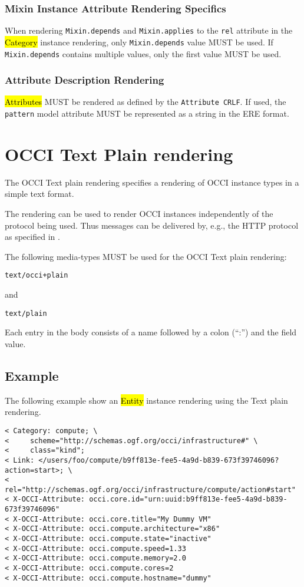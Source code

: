 \documentclass[10pt,a4paper]{article}
\begin{document}
\subsubsection{Mixin Instance Attribute Rendering Specifics}

When rendering {\tt Mixin.depends} and {\tt Mixin.applies} to the {\tt rel} attribute in the \hl{Category} instance rendering,
only {\tt Mixin.depends} value MUST be used. If {\tt Mixin.depends} contains multiple values, only the first value MUST
be used.

\subsubsection{Attribute Description Rendering}
\label{sec:format_attribute_description}

\hl{Attributes} MUST be rendered as defined by the {\tt Attribute CRLF}. If used, the {\tt pattern} model attribute
MUST be represented as a string in the ERE \cite{ere} format.

\section{OCCI Text Plain rendering}
\label{sec:text}
The OCCI Text plain rendering specifies a rendering of OCCI instance types in a simple text format.

The rendering can be used to render OCCI instances independently of the
protocol being used. Thus messages can be delivered by, e.g., the HTTP
protocol as specified in \cite{occi:http_protocol}.

The following media-types MUST be used for the OCCI Text plain rendering:

  {\tt text/occi+plain}

and

  {\tt text/plain}

Each entry in the body consists of a name followed by a colon (``:'') and the field value.

\subsection{Example}

The following example show an \hl{Entity} instance rendering using the Text plain rendering.

\begin{verbatim}
< Category: compute; \
<     scheme="http://schemas.ogf.org/occi/infrastructure#" \
<     class="kind";
< Link: </users/foo/compute/b9ff813e-fee5-4a9d-b839-673f39746096?action=start>; \
<     rel="http://schemas.ogf.org/occi/infrastructure/compute/action#start"
< X-OCCI-Attribute: occi.core.id="urn:uuid:b9ff813e-fee5-4a9d-b839-673f39746096"
< X-OCCI-Attribute: occi.core.title="My Dummy VM"
< X-OCCI-Attribute: occi.compute.architecture="x86"
< X-OCCI-Attribute: occi.compute.state="inactive"
< X-OCCI-Attribute: occi.compute.speed=1.33
< X-OCCI-Attribute: occi.compute.memory=2.0
< X-OCCI-Attribute: occi.compute.cores=2
< X-OCCI-Attribute: occi.compute.hostname="dummy"
\end{verbatim}
\end{document}
